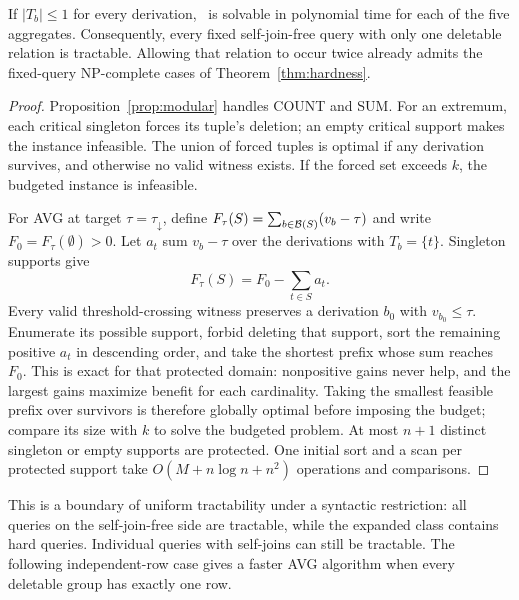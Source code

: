 \begin{theorem}
\label{thm:single-relation}
If $|T_b|\le1$ for every derivation, \MIW\ is solvable in polynomial
time for each of the five aggregates. Consequently, every fixed
self-join-free query with only one deletable relation is tractable.
Allowing that relation to occur twice already admits the fixed-query
NP-complete cases of Theorem~\ref{thm:hardness}.
\end{theorem}
\begin{proof}
Proposition~\ref{prop:modular} handles COUNT and SUM. For an extremum,
each critical singleton forces its tuple's deletion; an empty critical
support makes the instance infeasible. The union of forced tuples is
optimal if any derivation survives, and otherwise no valid witness exists.
If the forced set exceeds $k$, the budgeted instance is infeasible.

For AVG at target $\tau=\tau_{\downarrow}$, define
$F_\tau(S)=\sum_{b\in\mathcal{B}(S)}(v_b-\tau)$ and write
$F_0=F_\tau(\emptyset)>0$.
Let $a_t$ sum $v_b-\tau$ over the derivations with $T_b=\{t\}$.
Singleton supports give
\[
F_\tau(S)=F_0-\sum_{t\in S}a_t.
\]
Every valid threshold-crossing witness preserves a derivation $b_0$ with
$v_{b_0}\le\tau$.
Enumerate its possible support, forbid deleting that support, sort the
remaining positive $a_t$ in descending order, and take the shortest
prefix whose sum reaches $F_0$. This is exact for that protected domain:
nonpositive gains never help, and the largest gains maximize benefit for
each cardinality. Taking the smallest feasible prefix over survivors is
therefore globally optimal before imposing the budget; compare its size
with $k$ to solve the budgeted problem. At most $n+1$ distinct singleton or empty
supports are protected. One initial sort and a scan per protected support
take $O(M+n\log n+n^2)$ operations and comparisons.
\end{proof}
This is a boundary of uniform tractability under a syntactic restriction:
all queries on the self-join-free side are tractable, while the expanded
class contains hard queries. Individual queries with self-joins can still
be tractable. The following independent-row case gives a faster AVG
algorithm when every deletable group has exactly one row.

